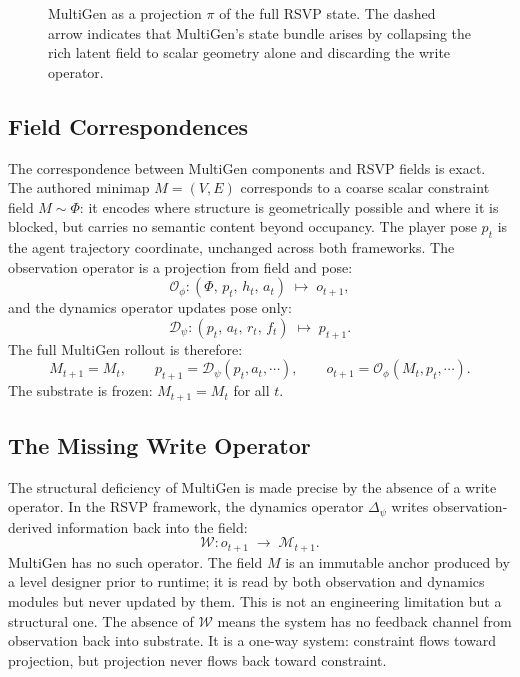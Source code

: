 \documentclass[11pt]{article}
\begin{document}
\begin{figure}[h]
\centering
{}
\caption{MultiGen as a projection $\pi$ of the full RSVP state.
The dashed arrow indicates that MultiGen's state bundle arises by
collapsing the rich latent field to scalar geometry alone and
discarding the write operator.}
\end{figure}

\subsection{Field Correspondences}

The correspondence between MultiGen components and RSVP fields is exact.
The authored minimap $M = (V,E)$ corresponds to a coarse scalar constraint
field $M \sim \Phi$: it encodes where structure is geometrically possible
and where it is blocked, but carries no semantic content beyond occupancy.
The player pose $p_t$ is the agent trajectory coordinate, unchanged across
both frameworks.
The observation operator is a projection from field and pose:
\[
\mathcal{O}_\phi : (\Phi,\, p_t,\, h_t,\, a_t) \;\mapsto\; o_{t+1},
\]
and the dynamics operator updates pose only:
\[
\mathcal{D}_\psi : (p_t,\, a_t,\, r_t,\, f_t) \;\mapsto\; p_{t+1}.
\]
The full MultiGen rollout is therefore:
\[
M_{t+1} = M_t, \qquad
p_{t+1} = \mathcal{D}_\psi(p_t, a_t, \cdots), \qquad
o_{t+1} = \mathcal{O}_\phi(M_t, p_t, \cdots).
\]
The substrate is frozen: $M_{t+1} = M_t$ for all $t$.

\subsection{The Missing Write Operator}

The structural deficiency of MultiGen is made precise by the absence of a
write operator.
In the RSVP framework, the dynamics operator $\Delta_\psi$ writes
observation-derived information back into the field:
\[
\mathcal{W} : o_{t+1} \;\longrightarrow\; \mathcal{M}_{t+1}.
\]
MultiGen has no such operator.
The field $M$ is an immutable anchor produced by a level designer prior to
runtime; it is read by both observation and dynamics modules but never
updated by them.
This is not an engineering limitation but a structural one.
The absence of $\mathcal{W}$ means the system has no feedback channel from
observation back into substrate.
It is a one-way system: constraint flows toward projection, but projection
never flows back toward constraint.
\end{document}
